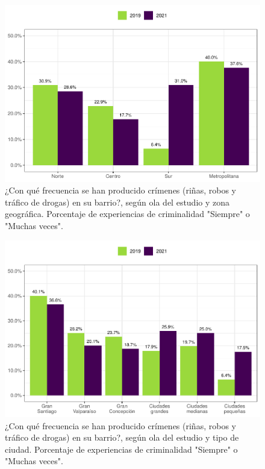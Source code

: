 \documentclass[
  12pt,
  openany]{book}
\begin{document}
\begin{figure}

{\centering \includegraphics{reporte-elsoc_files/figure-latex/crim-zona-1} 

}

\caption{¿Con qué frecuencia se han producido crímenes (riñas, robos y tráfico de drogas) en su barrio?, según ola del estudio y zona geográfica. Porcentaje de experiencias de criminalidad "Siempre" o "Muchas veces".}\label{fig:crim-zona}
\end{figure}

\begin{figure}

{\centering \includegraphics{reporte-elsoc_files/figure-latex/crim-estrato-1} 

}

\caption{¿Con qué frecuencia se han producido crímenes (riñas, robos y tráfico de drogas) en su barrio?, según ola del estudio y tipo de ciudad. Porcentaje de experiencias de criminalidad "Siempre" o "Muchas veces".}\label{fig:crim-estrato}
\end{figure}
\end{document}

